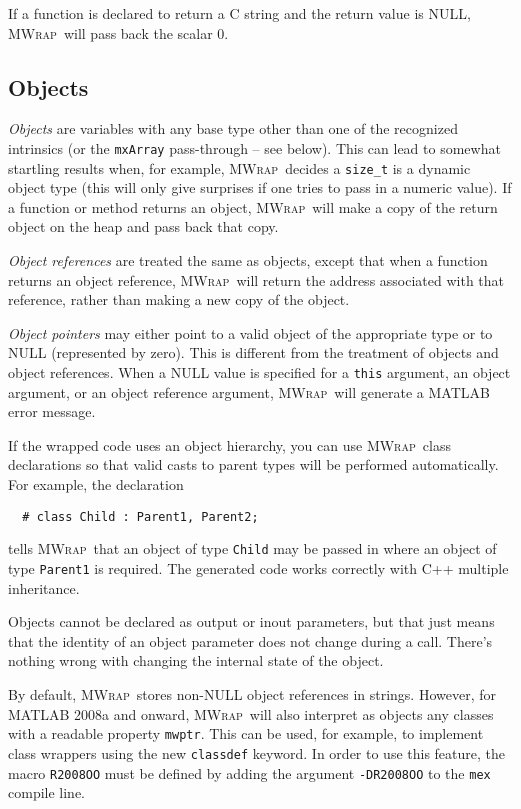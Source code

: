 \documentclass[12pt]{article}
\newcommand{\mwrap}{\textsc{MWrap}}
\begin{document}
If a function is declared to return a C string and the return value
is NULL, \mwrap\ will pass back the scalar 0.


\subsection{Objects}

{\it Objects} are variables with any base type other than one of the
recognized intrinsics (or the {\tt mxArray} pass-through -- see below).
This can lead to somewhat startling results when, for example, 
\mwrap\ decides a {\tt size\_t} is a dynamic object type (this will only
give surprises if one tries to pass in a numeric value).  If a function
or method returns an object, \mwrap\ will make a copy of the return object
on the heap and pass back that copy.

{\it Object references} are treated the same as objects, except
that when a function returns an object reference, \mwrap\ will
return the address associated with that reference, rather than
making a new copy of the object.

{\it Object pointers} may either point to a valid object of the
appropriate type or to NULL (represented by zero).  This is
different from the treatment of objects and object references.  When
a NULL value is specified for a {\tt this} argument, an object
argument, or an object reference argument, \mwrap\ will generate a
MATLAB error message.

If the wrapped code uses an object hierarchy, you can use \mwrap\ class
declarations so that valid casts to parent types will be performed
automatically.  For example, the declaration
\begin{verbatim}
  # class Child : Parent1, Parent2;
\end{verbatim}
tells \mwrap\ that an object of type {\tt Child} may be passed in where
an object of type {\tt Parent1} is required.  The generated code works
correctly with C++ multiple inheritance.

Objects cannot be declared as output or inout parameters, but that just
means that the identity of an object parameter does not change during a
call.  There's nothing wrong with changing the internal state of the object.

By default, \mwrap\ stores non-NULL object references in strings.
However, for MATLAB 2008a and onward, \mwrap\ will also interpret as objects
any classes with a readable property {\tt mwptr}.  This can be used, for
example, to implement class wrappers using the new {\tt classdef} keyword.
In order to use this feature, the macro {\tt R2008OO} must be defined
by adding the argument {\tt -DR2008OO} to the {\tt mex} compile line.
\end{document}
